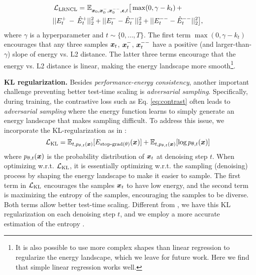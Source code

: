 \begin{equation}
\begin{aligned}
\l_{\text{LRNCL}} =\ &\E_{\x_0,\x_0^-,\x_0^{--},\eps,t}\big[\max(0,\gamma - k_t)\,+ \\
||E_t^+\,-\,\hat{E}_t^+&||_2^2 + ||E_t^{-} - \hat{E}_t^{-}||_2^2
+||E_t^{--} - \hat{E}_t^{--}||_2^2\big],
\end{aligned}
\end{equation}
where $\gamma$ is a hyperparameter and $t\sim\{0,\dots,T\}$. The first term $\max(0,\gamma-k_t)$ encourages that any three samples ${\boldsymbol{x}}_t$, ${\boldsymbol{x}}_t^-$, ${\boldsymbol{x}}_t^{--}$ have a positive (and larger-than-$\gamma$) slope of energy vs. L2 distance. The latter three terms encourage that the energy vs. L2 distance is linear, making the energy landscape more smooth\footnote{It is also possible to use more complex shapes than linear regression to regularize the energy landscape, which we leave for future work. Here we find that simple linear regression works well.}.

\textbf{KL regularization.} Besides \emph{performance-energy consistency}, another important challenge preventing better test-time scaling is \emph{adversarial sampling}. Specifically, during training, the contrastive loss such as Eq. \ref{eq:contrast} often leads to \emph{adversarial sampling} where the energy function learns to simply generate an energy landscape that makes sampling difficult. To address this issue, we incorporate the KL-regularization as in \citet{du2021improved}:
\begin{equation}
{\mathcal{L}}_\text{KL}={\mathbb{E}}_{t,p_{\theta,t}({\boldsymbol{x}})}[E_{\text{stop-grad}(\theta)}({\boldsymbol{x}})]+{\mathbb{E}}_{t,p_{\theta,t}({\boldsymbol{x}})}[\log p_{\theta,t}({\boldsymbol{x}})]
\end{equation}
where $p_{\theta,t}({\boldsymbol{x}})$ is the probability distribution of ${\boldsymbol{x}}_t$ at denoising step $t$. When optimizing w.r.t. ${\mathcal{L}}_\text{KL}$, it is essentially optimizing w.r.t. the sampling (denoising) process by shaping the energy landscape to make it easier to sample. The first term in ${\mathcal{L}}_\text{KL}$ encourages the samples ${\boldsymbol{x}}_t$ to have low energy, and the second term is maximizing the entropy of the samples, encouraging the samples to be diverse. Both terms allow better test-time scaling. Different from \citet{du2021improved}, we have this KL regularization on each denoising step $t$, and we employ a more accurate estimation of the entropy \cite{lombardi2016nonparametric}.

